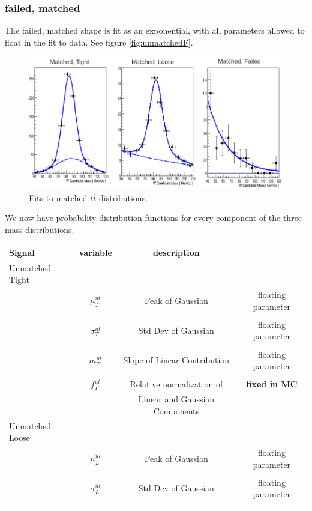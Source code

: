 \begin{}[h!]
\subsubsection*{failed, matched}
The failed, matched shape is fit as an exponential, with all parameters allowed to float in the fit to data. See figure \ref{fig:unmatchedF}.
\begin{figure}[h!]
\centering
\includegraphics[scale=0.5]{figs/WtagSF/matched_fits.png}
\caption{Fits to matched $t\overline{t}$ distributions.}\label{fig:matchedF}
\end{figure}
We now have probability distribution functions for every component of the three mass distributions.
\begin{table}
\centering
\begin{tabular}{l | c  c  c}
Signal & variable & description & \\
\hline\hline
Unmatched Tight & & & \\
& $\mu^{ut}_T$ & Peak of Gaussian & floating parameter\\
\\
& $\sigma^{ut}_T$ & Std Dev of Gaussian & floating parameter\\
\\
& $m^{ut}_T$ & Slope of Linear Contribution & floating parameter\\
\\
& $f^{ut}_T$ & Relative normalization of & \textbf{fixed in MC}\\
& &  Linear and Gaussian Components &\\
\hline
Unmatched Loose & & & \\
& $\mu^{ul}_L$ & Peak of Gaussian & floating parameter\\
\\
& $\sigma^{ul}_L$ & Std Dev of Gaussian & floating parameter\\
\\

\end{tabular}
\end{table}
\end{}
